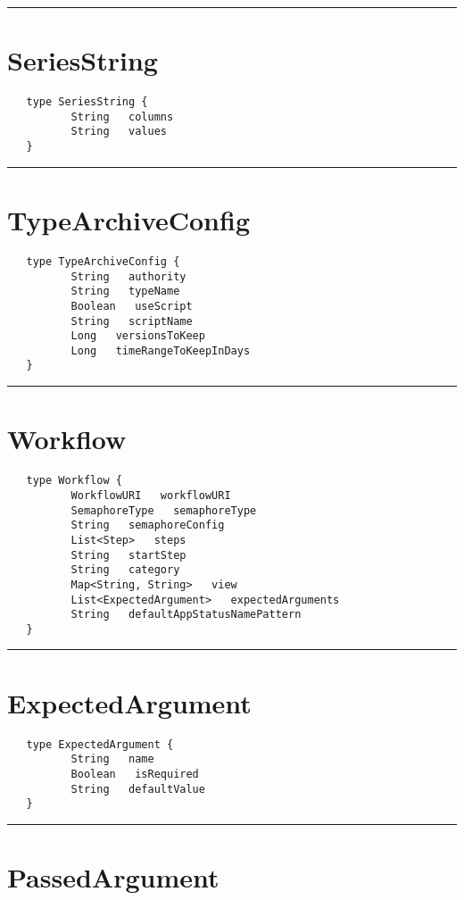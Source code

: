 \rule{12cm}{2pt}
\section{SeriesString}
\label{type:SeriesString}

\begin{verbatim}
   type SeriesString {
          String   columns
          String   values
   }
\end{verbatim}

\rule{12cm}{2pt}
\section{TypeArchiveConfig}
\label{type:TypeArchiveConfig}

\begin{verbatim}
   type TypeArchiveConfig {
          String   authority
          String   typeName
          Boolean   useScript
          String   scriptName
          Long   versionsToKeep
          Long   timeRangeToKeepInDays
   }
\end{verbatim}

\rule{12cm}{2pt}
\section{Workflow}
\label{type:Workflow}

\begin{verbatim}
   type Workflow {
          WorkflowURI   workflowURI
          SemaphoreType   semaphoreType
          String   semaphoreConfig
          List<Step>   steps
          String   startStep
          String   category
          Map<String, String>   view
          List<ExpectedArgument>   expectedArguments
          String   defaultAppStatusNamePattern
   }
\end{verbatim}

\rule{12cm}{2pt}
\section{ExpectedArgument}
\label{type:ExpectedArgument}

\begin{verbatim}
   type ExpectedArgument {
          String   name
          Boolean   isRequired
          String   defaultValue
   }
\end{verbatim}

\rule{12cm}{2pt}
\section{PassedArgument}
\label{type:PassedArgument}

